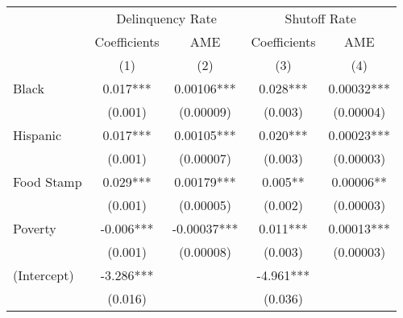 \begin{tabular}{lcccc}
\toprule 
\midrule 
 & \multicolumn{2}{c}{Delinquency Rate} & \multicolumn{2}{c}{Shutoff Rate} \\
 \cmidrule(lr){2-3} \cmidrule(lr){4-5} 
 & Coefficients & AME & Coefficients & AME \\
 & (1) & (2) & (3) & (4) \\
\midrule 
Black & 0.017*** & 0.00106*** & 0.028*** & 0.00032*** \\
 & (0.001) & (0.00009) & (0.003) & (0.00004) \\
Hispanic & 0.017*** & 0.00105*** & 0.020*** & 0.00023*** \\
 & (0.001) & (0.00007) & (0.003) & (0.00003) \\
Food Stamp & 0.029*** & 0.00179*** & 0.005** & 0.00006** \\
 & (0.001) & (0.00005) & (0.002) & (0.00003) \\
Poverty & -0.006*** & -0.00037*** & 0.011*** & 0.00013*** \\
 & (0.001) & (0.00008) & (0.003) & (0.00003) \\
(Intercept) & -3.286*** &  & -4.961*** &  \\
 & (0.016) &  & (0.036) &  \\
\midrule 
\bottomrule 
\end{tabular}
